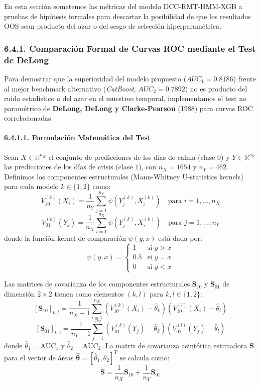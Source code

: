 \documentclass[
  12pt,
]{article}
\begin{document}
En esta sección sometemos las métricas del modelo DCC-RMT-HMM-XGB a
pruebas de hipótesis formales para descartar la posibilidad de que los
resultados OOS sean producto del azar o del sesgo de selección
hiperparamétrica.

\subsubsection{6.4.1. Comparación Formal de Curvas ROC mediante el Test de DeLong}\label{c.1.-comparaciuxf3n-formal-de-curvas-roc-mediante-el-test-de-delong}

Para demostrar que la superioridad del modelo propuesto
(\(AUC_1 = 0.8186\)) frente al mejor benchmark alternativo
(\emph{CatBoost}, \(AUC_2 = 0.7892\)) no es producto del ruido
estadístico o del azar en el muestreo temporal, implementamos el test no
paramétrico de \textbf{DeLong, DeLong y Clarke-Pearson} (1988) para
curvas ROC correlacionadas.

\paragraph{6.4.1.1. Formulación Matemática del Test}\label{c.1.1.-formulaciuxf3n-matemuxe1tica-del-test}

Sean \(X \in \mathbb{R}^{n_X}\) el conjunto de predicciones de los días
de calma (clase \(0\)) y \(Y \in \mathbb{R}^{n_Y}\) las predicciones de
los días de crisis (clase \(1\)), con \(n_X = 1654\) y \(n_Y = 462\).
Definimos los componentes estructurales (Mann-Whitney U-statistics
kernels) para cada modelo \(k \in \{1, 2\}\) como:
\[V_{10}^{(k)}(X_i) = \frac{1}{n_Y} \sum_{j=1}^{n_Y} \psi\left(Y_j^{(k)}, X_i^{(k)}\right) \quad \text{para } i=1,\dots,n_X\]
\[V_{01}^{(k)}(Y_j) = \frac{1}{n_X} \sum_{i=1}^{n_X} \psi\left(Y_j^{(k)}, X_i^{(k)}\right) \quad \text{para } j=1,\dots,n_Y\]
donde la función kernel de comparación \(\psi(y, x)\) está dada por:
\[\psi(y, x) = \begin{cases} 1 & \text{si } y > x \\ 0.5 & \text{si } y = x \\ 0 & \text{si } y < x \end{cases}\]

Las matrices de covarianza de los componentes estructurales
\(\mathbf{S}_{10}\) y \(\mathbf{S}_{01}\) de dimensión \(2 \times 2\)
tienen como elementos \((k, l)\) para \(k, l \in \{1, 2\}\):
\[[\mathbf{S}_{10}]_{k,l} = \frac{1}{n_X - 1} \sum_{i=1}^{n_X} \left( V_{10}^{(k)}(X_i) - \hat{\theta}_k \right) \left( V_{10}^{(l)}(X_i) - \hat{\theta}_l \right)\]
\[[\mathbf{S}_{01}]_{k,l} = \frac{1}{n_Y - 1} \sum_{j=1}^{n_Y} \left( V_{01}^{(k)}(Y_j) - \hat{\theta}_k \right) \left( V_{01}^{(l)}(Y_j) - \hat{\theta}_l \right)\]
donde \(\hat{\theta}_1 = \text{AUC}_1\) y
\(\hat{\theta}_2 = \text{AUC}_2\). La matriz de covarianza asintótica
estimadora \(\mathbf{S}\) para el vector de áreas
\(\hat{\boldsymbol{\theta}} = [\hat{\theta}_1, \hat{\theta}_2]^T\) se
calcula como:
\[\mathbf{S} = \frac{1}{n_X} \mathbf{S}_{10} + \frac{1}{n_Y} \mathbf{S}_{01}\]
\end{document}
